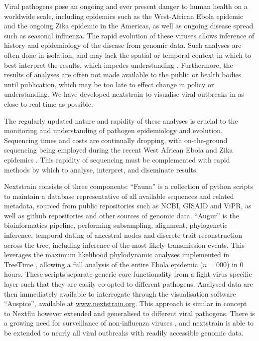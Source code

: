 \documentclass{bioinfo}
\begin{document}
\maketitle

Viral pathogens pose an ongoing and ever present danger to human health on a worldwide scale, including epidemics such as the West-African Ebola epidemic and the ongoing Zika epidemic in the Americas, as well as ongoing disease spread such as seasonal influenza.
The rapid evolution of these viruses allows inference of history and epidemiology of the disease from genomic data.
Such analyses are often done in isolation, and may lack the spatial or temporal context in which to best interpret the results, which impedes understanding \citep{pybus2013evolutionary}.
Furthermore, the results of analyses are often not made available to the public or health bodies until publication, which may be too late to effect change in policy or understanding.
We have developed nextstrain to visualise viral outbreaks in as close to real time as possible.


The regularly updated nature and rapidity of these analyses is crucial to the monitoring and understanding of pathogen epidemiology and evolution.
Sequencing times and costs are continually dropping, with on-the-ground sequencing being employed during the recent West African Ebola and Zika epidemics \citep{quick2016real,faria2017epidemic}.
This rapidity of sequencing must be complemented with rapid methods by which to analyse, interpret, and diseminate results.


Nextstrain consists of three components:
``Fauna'' is a collection of python scripts to maintain a database representative of all available sequences and related metadata, sourced from public repositories such as NCBI, GISAID and ViPR, as well as github repositories and other sources of genomic data. ``Augur'' is the bioinformatics pipeline, performing subsampling, alignment, phylogenetic inference, temporal dating of ancestral nodes and discrete trait reconstruction across the tree, including inference of the most likely transmission events.
This leverages the maximum likelihood phylodynamic analyses implemented in TreeTime \citep{sagulenko2017treetime}, allowing a full analysis of the entire Ebola epidemic ($n=000$) in 0 hours.
These scripts separate generic core functionality from a light virus specific layer such that they are easily co-opted to different pathogens.
Analysed data are then immediately available to interrogate through the visualisation software ``Auspice'', available at \href{www.nextstrain.org}{www.nextstrain.org}.
This approach is similar in concept to Nextflu \citep{neher2015nextflu} however extended and generalised to different viral pathogens.
There is a growing need for surveillance of non-influenza viruses \citep{tang2017global}, and nextstrain is able to be extended to nearly all viral outbreaks with readily accessible genomic data.
\end{document}

